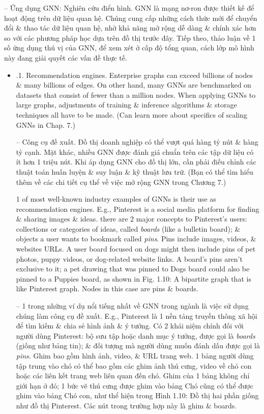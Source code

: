 \documentclass{article}
\begin{document}
\begin{itemize}
\begin{itemize}
        -- {\sf Ứng dụng GNN: Nghiên cứu điển hình.} GNN là mạng nơ-ron được thiết kế để hoạt động trên dữ liệu quan hệ. Chúng cung cấp những cách thức mới để chuyển đổi \& thao tác dữ liệu quan hệ, nhờ khả năng mở rộng dễ dàng \& chính xác hơn so với các phương pháp học dựa trên đồ thị trước đây. Tiếp theo, thảo luận về 1 số ứng dụng thú vị của GNN, để xem xét ở cấp độ tổng quan, cách lớp mô hình này đang giải quyết các vấn đề thực tế.
        \begin{itemize}
            \item {.1. Recommendation engines.} Enterprise graphs can exceed billions of nodes \& many billions of edges. On other hand, many GNNs are benchmarked on datasets that consist of fewer than a million nodes. When applying GNNs to large graphs, adjustments of training \& inference algorithms \& storage techniques all have to be made. (Can learn more about specifics of scaling GNNs in Chap. 7.)

            -- {\sf Công cụ đề xuất.} Đồ thị doanh nghiệp có thể vượt quá hàng tỷ nút \& hàng tỷ cạnh. Mặt khác, nhiều GNN được đánh giá chuẩn trên các tập dữ liệu có ít hơn 1 triệu nút. Khi áp dụng GNN cho đồ thị lớn, cần phải điều chỉnh các thuật toán huấn luyện \& suy luận \& kỹ thuật lưu trữ. (Bạn có thể tìm hiểu thêm về các chi tiết cụ thể về việc mở rộng GNN trong Chương 7.)

            1 of most well-known industry examples of GNNs is their use as recommendation engines. E.g., Pinterest is a social media platform for finding \& sharing images \& ideas. there are 2 major concepts to Pinterest's users: collections or categories of ideas, called {\it boards}  (like a bulletin board); \& objects a user wants to bookmark called {\it pins}. Pins include images, videos, \& websites URLs. A user board focused on dogs might then include pins of pet photos, puppy videos, or dog-related website links. A board's pins aren't exclusive to it; a pet drawing that was pinned to Dogs board could also be pinned to a Puppies board, as shown in {\sf Fig. 1.10: A bipartite graph that is like Pinterest graph. Nodes in this case are pins \& boards}.

            -- 1 trong những ví dụ nổi tiếng nhất về GNN trong ngành là việc sử dụng chúng làm công cụ đề xuất. E.g., Pinterest là 1 nền tảng truyền thông xã hội để tìm kiếm \& chia sẻ hình ảnh \& ý tưởng. Có 2 khái niệm chính đối với người dùng Pinterest: bộ sưu tập hoặc danh mục ý tưởng, được gọi là {\it boards} (giống như bảng tin); \& đối tượng mà người dùng muốn đánh dấu được gọi là {\it pins}. Ghim bao gồm hình ảnh, video, \& URL trang web. 1 bảng người dùng tập trung vào chó có thể bao gồm các ghim ảnh thú cưng, video về chó con hoặc các liên kết trang web liên quan đến chó. Ghim của 1 bảng không chỉ giới hạn ở đó; 1 bức vẽ thú cưng được ghim vào bảng Chó cũng có thể được ghim vào bảng Chó con, như thể hiện trong {\sf Hình 1.10: Đồ thị hai phần giống như đồ thị Pinterest. Các nút trong trường hợp này là ghim \& boards}.


\end{itemize}
\end{itemize}
\end{itemize}
\end{document}
